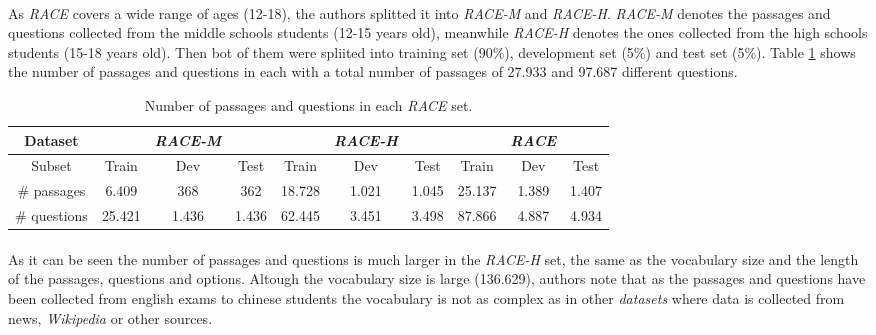 \paragraph{}
As \emph{RACE} covers a wide range of ages (12-18), the authors splitted it into \emph{RACE-M} and \emph{RACE-H}. \emph{RACE-M} denotes the passages and questions collected from the middle schools students (12-15 years old), meanwhile \emph{RACE-H} denotes the ones collected from the high schools students (15-18 years old). Then bot of them were spliited into training set (90\%), development set (5\%) and test set (5\%). Table \ref{tab:race-sets} shows the number of passages and questions in each with a total number of passages of 27.933 and 97.687 different questions.
\begin{table}[!h]
	\begin{tabular}{|c|ccc|ccc|ccc|}
	\hline 
	Dataset &  & \emph{RACE-M} &  &  & \emph{RACE-H} &  &  & \emph{RACE} & \\ 
	\hline 
	Subset & Train & Dev & Test & Train & Dev & Test & Train & Dev & Test \\ 
	\hline 
	\# passages & 6.409 & 368 & 362 & 18.728 & 1.021 & 1.045 & 25.137 & 1.389 & 1.407 \\ 
	\hline 
	\# questions & 25.421 & 1.436 & 1.436 & 62.445 & 3.451 & 3.498 & 87.866 & 4.887 & 4.934 \\ 
	\hline 
	\end{tabular} 
	\caption{Number of passages and questions in each \emph{RACE} set.}
	\label{tab:race-sets}
\end{table}
\paragraph{}
As it can be seen the number of passages and questions is much larger in the \emph{RACE-H} set, the same as the vocabulary size and the length of the passages, questions and options. Altough the vocabulary size is large (136.629), authors note that as the passages and questions have been collected from english exams to chinese students the vocabulary is not as complex as in other \emph{datasets} where data is collected from news, \emph{Wikipedia} or other sources. 
